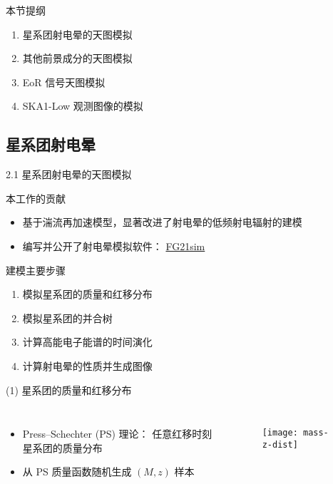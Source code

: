 \documentclass{beamer}
\begin{document}
\begin{frame}
  \begin{block}{本节提纲}
  \begin{enumerate}
    \item 星系团射电晕的天图模拟
    \item 其他前景成分的天图模拟
    \item EoR 信号天图模拟
    \item SKA1-Low 观测图像的模拟
  \end{enumerate}
  \end{block}
\end{frame}

\subsection{星系团射电晕}

\begin{frame}{2.1 星系团射电晕的天图模拟}
  \begin{alertblock}{本工作的贡献}
    \begin{itemize}
      \item 基于湍流再加速模型，显著改进了射电晕的低频射电辐射的建模
      \item 编写并公开了射电晕模拟软件：
        \href{https://github.com/liweitianux/fg21sim}{FG21sim}
    \end{itemize}
  \end{alertblock}
  \begin{alertblock}{建模主要步骤}
    \begin{enumerate}
      \item 模拟星系团的质量和红移分布
      \item 模拟星系团的并合树
      \item 计算高能电子能谱的时间演化
      \item 计算射电晕的性质并生成图像
    \end{enumerate}
  \end{alertblock}
\end{frame}

\begin{frame}[t]
  \begin{alertblock}{(1) 星系团的质量和红移分布}
  \end{alertblock}
  \begin{columns}
    \begin{itemize}
      \item Press--Schechter (PS) 理论：
        任意红移时刻星系团的质量分布
      \item 从 PS 质量函数随机生成 $(M, z)$ 样本
    \end{itemize}

    \begin{figure}
      \centering
      \texttt{[image: mass-z-dist]}
    \end{figure}
  \end{columns}
\end{frame}
\end{document}
